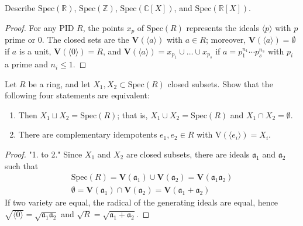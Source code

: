 \begin{exr}
    Describe \(\mathrm{Spec}(\mathbb{R})\), \(\mathrm{Spec}(\mathbb{Z})\), \(\mathrm{Spec}(\mathbb{C}[X])\), and \(\mathrm{Spec}(\mathbb{R}[X])\).
\end{exr}
\begin{proof}
    For any PID \(R\), the points \(x_p\) of \(\mathrm{Spec}(R)\) represents the ideals \(\langle p \rangle\) with \(p\) prime or \(0\). The closed sets are the \(\mathbf{V}(\langle a \rangle)\) with \(a \in R\); moreover, \(\mathbf{V}(\langle a \rangle) = \emptyset\) if \(a\) is a unit, \(\mathbf{V}(\langle 0 \rangle) = R\), and \(\mathbf{V}(\langle a \rangle) = x_{p_1} \cup \ldots \cup x_{p_s}\) if \(a = p_1^{n_1} \cdots p_s^{n_s}\) with \(p_i\) a prime and \(n_i \leq 1\).
\end{proof}
\begin{exr}
    Let \(R\) be a ring, and let \(X_1, X_2 \subset \mathrm{Spec}(R)\) closed subsets. Show that the following four statements are equivalent:
    \begin{enumerate}
        \item Then \(X_1 \sqcup X_2 = \mathrm{Spec}(R)\); that is, \(X_1 \cup X_2 = \mathrm{Spec}(R)\) and \(X_1 \cap X_2 = \emptyset\).
        \item There are complementary idempotents \(e_1, e_2 \in R\) with \(\mathrm{V}(\langle e_i \rangle) = X_i\).
    \end{enumerate}
\end{exr}
\begin{proof}
    "1. to 2." Since \(X_1\) and \(X_2\) are closed subsets, there are ideals \(\mathfrak{a}_1\) and \(\mathfrak{a}_2\) such that
    \begin{align}
        \mathrm{Spec}(R) = \mathbf{V}(\mathfrak{a}_1) \cup \mathbf{V}(\mathfrak{a}_2) = \mathbf{V}(\mathfrak{a}_1 \mathfrak{a}_2) \\
        \emptyset = \mathbf{V}(\mathfrak{a}_1) \cap \mathbf{V}(\mathfrak{a}_2) = \mathbf{V}(\mathfrak{a_1} + \mathfrak{a}_2)
    \end{align}
    If two variety are equal, the radical of the generating ideals are equal, hence \(\sqrt{\langle 0 \rangle} = \sqrt{\mathfrak{a}_1 \mathfrak{a}_2}\) and \(\sqrt{R} = \sqrt{\mathfrak{a}_1 + \mathfrak{a}_2}\).
\end{proof}